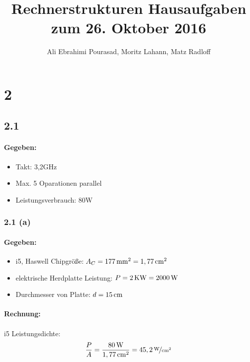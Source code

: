 \documentclass[11pt,a4paper]{article}
\title{\textbf{Rechnerstrukturen Hausaufgaben zum 26. Oktober 2016}}
\author{Ali Ebrahimi Pourasad, Moritz Lahann, Matz Radloff}
\begin{document}
  \maketitle
  \date{}
  \tableofcontents
  \newpage

\section{2} %

\subsection{2.1} %

\paragraph{Gegeben:}
\begin{itemize}
  \item Takt: 3,2GHz
  \item Max. 5 Oparationen parallel
  \item Leistungsverbrauch: 80W
\end{itemize}


\subsubsection{2.1 (a)}
\paragraph{Gegeben:}
\begin{itemize}
  \item i5, Haswell Chipgröße: $A_C = \unit[177]{mm^2} = \unit[1,77]{cm^2}$
  \item elektrische Herdplatte Leistung: $P = \unit[2]{KW} = \unit[2000]{W}$
  \item Durchmesser von Platte: $d = \unit[15]{cm}$
\end{itemize}

\paragraph{Rechnung:}
\paragraph{}i5 Leistungsdichte:
\begin{equation}
\frac{P}{A} = \frac{\unit[80]{W}}{\unit[1,77]{cm^2}} = \unitfrac[45,2]{W}{cm^2}
\end{equation}
\end{document}

